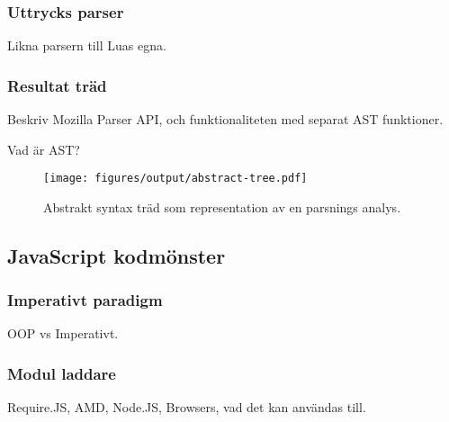 \subsubsection{Uttrycks parser}

Likna parsern till Luas egna.

\subsubsection{Resultat träd}

Beskriv Mozilla Parser API, och funktionaliteten med separat AST funktioner.

Vad är AST?

\begin{figure}[ht]
  \texttt{[image: figures/output/abstract-tree.pdf]}
  \caption{Abstrakt syntax träd som representation av en parsnings analys.}
\end{figure}

\subsection{JavaScript kodmönster}

\subsubsection{Imperativt paradigm}

OOP vs Imperativt.

\subsubsection{Modul laddare}

Require.JS, AMD, Node.JS, Browsers, vad det kan användas till.

